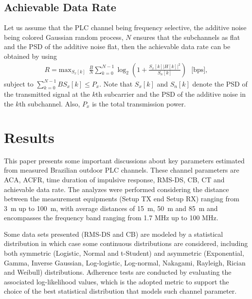 \documentclass[journal]{IEEEtran}
\begin{document}
	\subsection{Achievable Data Rate}
	
	Let us assume that the PLC channel being frequency selective, the additive noise being colored Gaussian random process, $N$ ensures that the subchannels as flat and the \ac{PSD} of the additive noise flat, then the achievable data rate can be obtained by using \cite{Cover2006}
	\begin{eqnarray} \label{eq-txMedia}
	R = \mbox{max}_{S_x[k]} \ \ \frac{B}{N}\sum_{k=0}^{N-1}\log_2\left(1+ \frac{S_x[k]|H[k]|^2}{S_n[k]}\right)\ \ \ \mbox{[bps]},
	\end{eqnarray}
	subject to $\sum_{k=0}^{N-1} BS_x[k] \leq P_x$. Note that $S_x[k]$ and  $S_n[k]$ denote the \ac{PSD} of the transmitted signal at the $k$th subcarrier and the \ac{PSD} of the additive noise in the $k$th subchannel. Also, $P_x$ is the total transmission power.
	
	
	\section{Results} \label{sec-caracteristicas_canal_outdoor} 
	This paper presents some important discussions about key parameters estimated from measured Brazilian outdoor PLC channels. These channel parameters are \ac{ACA}, \ac{ACFR}, time duration of impulsive response, \ac{RMS-DS}, \ac{CB}, \ac{CT} and achievable data rate. The analyzes were performed considering the distance between the measurement equipments (Setup TX end Setup RX) ranging from 3~m up to 100~m, with average distances of 15~m, 50~m and 85~m and encompasses the frequency band ranging from 1.7 MHz up to 100 MHz.
	
	Some data sets presented (RMS-DS and CB) are modeled by a statistical distribution in which case some continuous distributions are considered, including both symmetric (Logistic, Normal and t-Student) and asymmetric (Exponential, Gamma, Inverse Gaussian, Log-logistic, Log-normal, Nakagami, Rayleigh, Rician and Weibull) distributions. Adherence tests are conducted by evaluating the associated log-likelihood values, which is the adopted metric to support the choice of the best statistical distribution that models such channel parameter.
	
\end{document}
